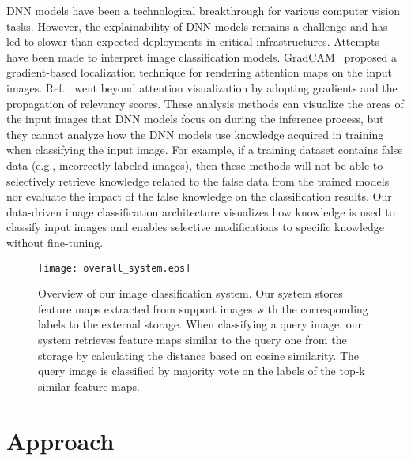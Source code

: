 \documentclass[runningheads]{llncs}
\begin{document}
DNN models have been a technological breakthrough for various computer vision tasks.
However, the explainability of DNN models remains a challenge and has led to
slower-than-expected deployments in critical infrastructures.
Attempts~\cite{CAM,GradCAM,TIBAV} have been made to interpret image classification models.
GradCAM~\cite{GradCAM} proposed a gradient-based localization technique for rendering attention
maps on the input images. Ref.~\cite{TIBAV} went beyond attention visualization by adopting gradients and the propagation of relevancy scores.
These analysis methods can visualize the areas of the input images that DNN models focus on during the inference process,
but they cannot analyze how the DNN models use knowledge acquired in training when classifying the input image.
For example, if a training dataset contains false data (e.g., incorrectly labeled images),
then these methods will not be able to selectively retrieve knowledge related to the false data from the trained models nor evaluate the impact of the false knowledge on the classification results.
Our data-driven image classification architecture visualizes how knowledge is used to classify input images and enables selective modifications to specific knowledge without fine-tuning.


\begin{figure}[t]
   \begin{center}
   \texttt{[image: overall\_system.eps]}
   \end{center}
   \caption{Overview of our image classification system. Our system stores feature maps extracted from support images with the corresponding labels to the external storage.
   When classifying a query image, our system retrieves feature maps similar to the query one from the storage by calculating the distance based on cosine similarity.
   The query image is classified by majority vote on the labels of the top-k similar feature maps.}
   \label{fig:overview}
\end{figure}


\section{Approach}
\label{sec:proposed_system}
\end{document}
